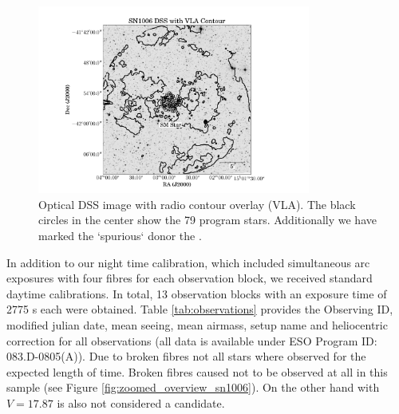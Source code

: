 \begin{figure}[htbp] %
   \centering
   \includegraphics[width=0.8\textwidth]{chapter_sn1006/plots/sn1006_overlay_withsm.pdf} 
   \caption[Overview of candidates and remnantin SN 1006]{Optical DSS image with radio contour overlay (VLA). The black circles in the center show the 79 program stars. Additionally we have marked the `spurious` donor the \smstar.}
   \label{fig:overview_sn1006}
\end{figure}
In addition to our night time calibration, which included simultaneous arc exposures with four fibres for each observation block, we received standard daytime calibrations. In total, 13 observation blocks with an exposure time of 2775 s each were obtained. Table \ref{tab:observations} provides the Observing ID, modified julian date, mean seeing, mean airmass, setup name and heliocentric correction for all observations (all data is available under ESO Program ID: 083.D-0805(A)). Due to broken fibres not all stars where observed for the expected length of time. Broken fibres caused  not to be observed at all in this sample (see Figure \ref{fig:zoomed_overview_sn1006}). On the other hand  with $V=17.87$ is also not considered a candidate.



